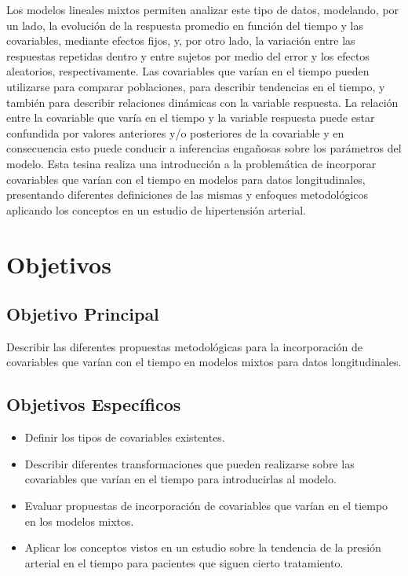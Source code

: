 \documentclass[12pt]{article}
\begin{document}
Los modelos lineales mixtos permiten
analizar este tipo de datos, modelando, por un lado, la evolución de la respuesta promedio en función del tiempo y las
covariables, mediante efectos fijos, y, por otro lado, la variación entre las respuestas repetidas dentro y entre sujetos
por medio del error y los efectos aleatorios, respectivamente. Las covariables que varían en el tiempo pueden
utilizarse para comparar poblaciones, para describir tendencias en el tiempo, y también para describir relaciones
dinámicas con la variable respuesta. La relación entre la covariable que varía en el tiempo y la variable respuesta
puede estar confundida por valores anteriores y/o posteriores de la covariable y en consecuencia esto puede conducir
a inferencias engañosas sobre los parámetros del modelo. Esta tesina realiza una introducción a la problemática de
incorporar covariables que varían con el tiempo en modelos para datos longitudinales, presentando diferentes definiciones
de las mismas y enfoques metodológicos aplicando los conceptos en un estudio de hipertensión arterial. 


\newpage
\section{Objetivos}

\subsection{Objetivo Principal}

Describir las diferentes propuestas metodológicas para la incorporación de covariables que varían con
el tiempo en modelos mixtos para datos longitudinales.

\subsection{Objetivos Específicos}

\begin{itemize}
	\item Definir los tipos de covariables existentes.
	\item Describir diferentes transformaciones que pueden realizarse sobre las covariables que varían en el tiempo
		  para introducirlas al modelo.
	\item Evaluar propuestas de incorporación de covariables que varían en el tiempo en los modelos mixtos.
	\item Aplicar los conceptos vistos en un estudio sobre la tendencia de la presión arterial en el tiempo para pacientes
		  que siguen cierto tratamiento.
\end{itemize}
\end{document}
